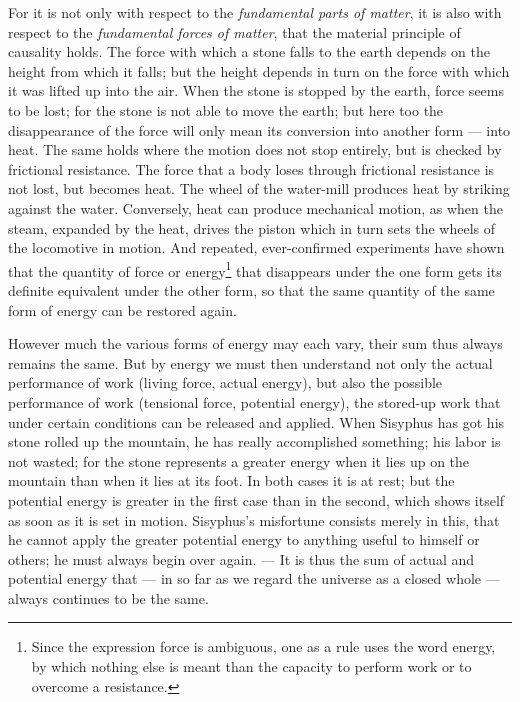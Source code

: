 \documentclass[12pt,a4paper]{book}
\newcommand{\opage}[1]{\marginnote{\footnotesize\textit{[#1]}}}
\begin{document}
For it is not only with respect to the \emph{fundamental parts of
matter}, it is also with respect to the \emph{fundamental forces of
matter}, that the material principle of causality holds. The force with
which a stone falls to the earth depends on the height from which it
falls; but the height depends in turn on the force with which it was
lifted up into the air. When the stone is stopped by the earth, force
seems to be lost; for the stone is not able to move the earth; but here
too the disappearance of the force will only
\opage{39}mean its conversion into another form --- into heat. The same
holds where the motion does not stop entirely, but is checked by
frictional resistance. The force that a body loses through frictional
resistance is not lost, but becomes heat. The wheel of the water-mill
produces heat by striking against the water. Conversely, heat can
produce mechanical motion, as when the steam, expanded by the heat,
drives the piston which in turn sets the wheels of the locomotive in
motion. And repeated, ever-confirmed experiments have shown that the
quantity of force or
energy\footnote{Since the expression force is ambiguous, one as a rule
uses the word energy, by which nothing else is meant than the capacity
to perform work or to overcome a resistance.} that disappears under the
one form gets its definite equivalent under the other form, so that the
same quantity of the same form of energy can be restored again.

However much the various forms of energy may each vary, their sum thus
always remains the same. But by energy we must then understand not only
the actual performance of work (living force, actual energy), but also
the possible performance of work (tensional force, potential energy),
the stored-up work that under certain conditions can be released and
applied. When Sisyphus has got his stone rolled up the mountain, he has
really accomplished something; his labor is not wasted; for the stone
represents a greater energy when it lies up on the mountain than when it
lies at its foot. In both cases it is at rest; but the potential energy
is greater in the first case than in the second, which shows itself as
soon as it is set in motion. Sisyphus's misfortune consists merely in
this, that he cannot apply the greater potential energy to anything
useful to himself or others; he must always begin over again. --- It is
thus the sum of actual and potential energy that --- in so far as we
regard the universe as a closed whole --- always continues to be the
same.
\end{document}
